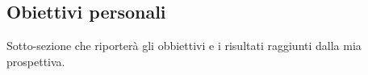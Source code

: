 \subsection{Obiettivi personali}

Sotto-sezione che riporterà gli obbiettivi e i risultati raggiunti dalla mia prospettiva.